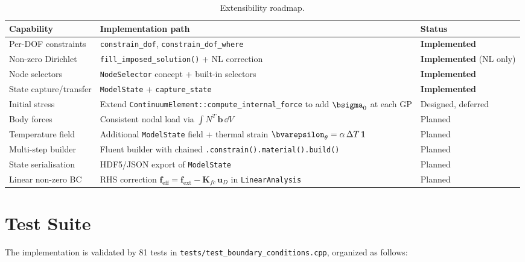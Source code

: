 \begin{table}[ht]
\centering\small
\caption{Extensibility roadmap.}
\label{tab:bc-roadmap}
\begin{tabular}{p{3.5cm}p{5cm}p{5cm}}
\toprule
\textbf{Capability} & \textbf{Implementation path} & \textbf{Status} \\
\midrule
Per-DOF constraints
  & \texttt{constrain\_dof}, \texttt{constrain\_dof\_where}
  & \textbf{Implemented} \\
Non-zero Dirichlet
  & \texttt{fill\_imposed\_solution()} + NL correction
  & \textbf{Implemented} (NL only) \\
Node selectors
  & \texttt{NodeSelector} concept + built-in selectors
  & \textbf{Implemented} \\
State capture/transfer
  & \texttt{ModelState} + \texttt{capture\_state}
  & \textbf{Implemented} \\
\addlinespace
Initial stress
  & Extend \texttt{ContinuumElement::compute\_internal\_force}
    to add $\bsigma_0$ at each GP
  & Designed, deferred \\
Body forces
  & Consistent nodal load via $\int N^T\,\mathbf{b}\,\dd V$
  & Planned \\
Temperature field
  & Additional \texttt{ModelState} field + thermal strain
    $\bvarepsilon_\theta = \alpha\,\Delta T\,\mathbf{1}$
  & Planned \\
Multi-step builder
  & Fluent builder with chained \texttt{.constrain().material().build()}
  & Planned \\
State serialisation
  & HDF5/JSON export of \texttt{ModelState}
  & Planned \\
Linear non-zero BC
  & RHS correction $\mathbf{f}_{\text{eff}} = \mathbf{f}_{\text{ext}}
    - \mathbf{K}_{fc}\,\mathbf{u}_D$  in \texttt{LinearAnalysis}
  & Planned \\
\bottomrule
\end{tabular}
\end{table}


\section{Test Suite}
\label{sec:bc-tests}

The implementation is validated by 81 tests in
\texttt{tests/test\_boundary\_conditions.cpp}, organized as follows:


